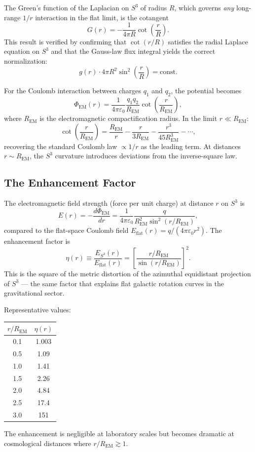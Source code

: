 \documentclass[a4paper]{article}
\begin{document}
The Green's function of the Laplacian on $S^3$ of radius $R$, which governs
\emph{any} long-range $1/r$ interaction in the flat limit, is the cotangent
\[
G(r) = -\frac{1}{4\pi R}\cot\!\left(\frac{r}{R}\right).
\]
This result is verified by confirming that $\cot(r/R)$ satisfies the radial
Laplace equation on $S^3$ and that the Gauss-law flux integral yields the
correct normalization:
\[
g(r) \cdot 4\pi R^2 \sin^2\!\left(\frac{r}{R}\right) = \text{const.}
\]

For the Coulomb interaction between charges $q_1$ and $q_2$, the potential
becomes
\begin{equation}
\label{eq:cotangent-coulomb}
\Phi_{\text{EM}}(r) = \frac{1}{4\pi\varepsilon_0}\frac{q_1 q_2}{R_{\text{EM}}}
\cot\!\left(\frac{r}{R_{\text{EM}}}\right),
\end{equation}
where $R_{\text{EM}}$ is the electromagnetic compactification radius. In the
limit $r \ll R_{\text{EM}}$:
\[
\cot\!\left(\frac{r}{R_{\text{EM}}}\right) = \frac{R_{\text{EM}}}{r}
- \frac{r}{3R_{\text{EM}}} - \frac{r^3}{45R_{\text{EM}}^3} - \cdots,
\]
recovering the standard Coulomb law $\propto 1/r$ as the leading term. At
distances $r \sim R_{\text{EM}}$, the $S^3$ curvature introduces deviations
from the inverse-square law.

\subsection{The Enhancement Factor}

The electromagnetic field strength (force per unit charge) at distance $r$ on
$S^3$ is
\begin{equation}
\label{eq:em-field}
E(r) = -\frac{d\Phi_{\text{EM}}}{dr}
= \frac{1}{4\pi\varepsilon_0}\frac{q}{R_{\text{EM}}^2 \sin^2(r/R_{\text{EM}})},
\end{equation}
compared to the flat-space Coulomb field $E_{\text{flat}}(r) = q/(4\pi\varepsilon_0 r^2)$.
The enhancement factor is
\begin{equation}
\label{eq:eta}
\eta(r) \equiv \frac{E_{S^3}(r)}{E_{\text{flat}}(r)}
= \left[\frac{r/R_{\text{EM}}}{\sin(r/R_{\text{EM}})}\right]^2.
\end{equation}
This is the square of the metric distortion of the azimuthal equidistant
projection of $S^3$ --- the same factor that explains flat galactic rotation
curves in the gravitational sector.

Representative values:
\begin{center}
\begin{tabular}{cc}
\toprule
$r/R_{\text{EM}}$ & $\eta(r)$ \\
\midrule
0.1 & 1.003 \\
0.5 & 1.09 \\
1.0 & 1.41 \\
1.5 & 2.26 \\
2.0 & 4.84 \\
2.5 & 17.4 \\
3.0 & 151 \\
\bottomrule
\end{tabular}
\end{center}
The enhancement is negligible at laboratory scales but becomes dramatic at
cosmological distances where $r/R_{\text{EM}} \gtrsim 1$.
\end{document}
